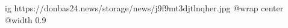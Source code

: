  
 
 
 
 

\ifcmt
  ig https://donbas24.news/storage/news/j9f9mt3djtlnqher.jpg
  @wrap center
  @width 0.9
\fi

